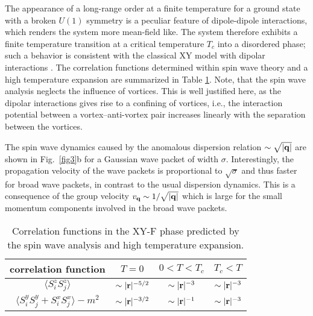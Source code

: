The appearance of a long-range order at a finite temperature for a ground state with a broken $U(1)$ symmetry is
a peculiar feature of dipole-dipole interactions, which renders the system more mean-field like.  The system therefore
exhibits a finite temperature transition at a critical temperature $T_{c}$ into a disordered phase; such a behavior is 
consistent with the classical XY model with dipolar interactions \cite{bruno01}. The correlation functions determined
within spin wave theory and a high temperature expansion are summarized in Table \ref{table2}.
 Note, that the spin wave analysis neglects the influence of vortices. This is well justified here, 
as the dipolar interactions gives rise to a  confining of vortices, i.e., the interaction potential 
between a vortex--anti-vortex pair increases linearly with the separation between the vortices.

The spin wave dynamics caused by the anomalous dispersion relation $\sim \sqrt{|{\bf q}|}$ are shown in Fig.~\ref{fig3}b for a Gaussian wave packet of width $\sigma$. Interestingly, the propagation velocity of the wave packets is proportional to $\sqrt{\sigma}$ and thus faster for broad wave packets, in contrast to the usual dispersion dynamics. This is a consequence of the group velocity $v_{\bf q} \sim 1/\sqrt{|{\bf q}|}$ which is large for the small momentum components involved in the broad wave packets. 

\begin{table}
\begin{tabular}{c c c c}
\toprule
 correlation function &  \hspace{10pt} $T=0$    \hspace{10pt}&   \hspace{10pt} $0 < T< T_{c}$    \hspace{10pt}&   \hspace{10pt}$T_{c}< T $    \hspace{10pt}\\
 \hline
$ \langle S^{z}_{i} S^{z}_{j}\rangle$  &$ \sim |{\bf r}|^{-5/2}$  & $\sim |{\bf r}|^{-3}$ &  $\sim |{\bf r}|^{-3}$ \\
$ \langle S^{y}_{i} S^{y}_{j}+ S^{x}_{i} S^{x}_{j}\rangle- m^2$  &$ \sim |{\bf r}|^{-3/2}$ &  $\sim |{\bf r}|^{-1}$ &  $\sim |{\bf r}|^{-3}$
\end{tabular}
\caption{ \label{table2} Correlation functions in the XY-F phase predicted by the spin wave analysis and high temperature expansion. }
\end{table}




